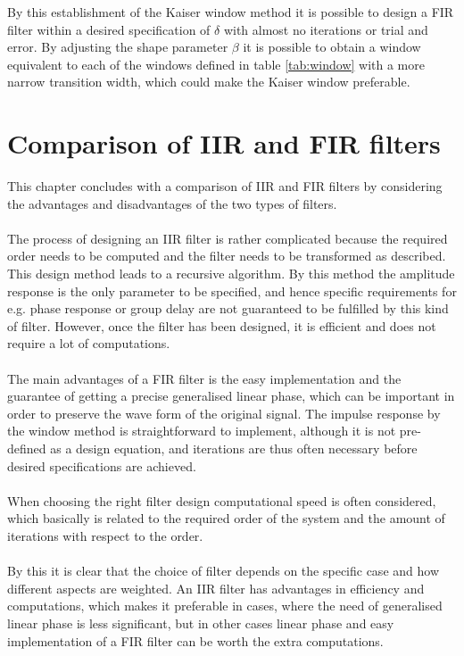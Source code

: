 By this establishment of the Kaiser window method it is possible to design a FIR filter within a desired specification of $\delta$ with almost no iterations or trial and error. By adjusting the shape parameter $\beta$ it is possible to obtain a window equivalent to each of the windows defined in table \ref{tab:window} with a more narrow transition width, which could make the Kaiser window preferable.

\section{Comparison of IIR and FIR filters}
This chapter concludes with a comparison of IIR and FIR filters by considering the advantages and disadvantages of the two types of filters.
\\ \\
The process of designing an IIR filter is rather complicated because the required order needs to be computed and the filter needs to be transformed as described. This design method leads to a recursive algorithm. By this method the amplitude response is the only parameter to be specified, and hence specific requirements for e.g. phase response or group delay are not guaranteed to be fulfilled by this kind of filter. However, once the filter has been designed, it is efficient and does not require a lot of computations.
\\ \\
The main advantages of a FIR filter is the easy implementation and the guarantee of getting a precise generalised linear phase, which can be important in order to preserve the wave form of the original signal. The impulse response by the window method is straightforward to implement, although it is not pre-defined as a design equation, and iterations are thus often necessary before desired specifications are achieved.
\\ \\
When choosing the right filter design computational speed is often considered, which basically is related to the required order of the system and the amount of iterations with respect to the order.
\\ \\
By this it is clear that the choice of filter depends on the specific case and how different aspects are weighted. An IIR filter has advantages in efficiency and computations, which makes it preferable in cases, where the need of generalised linear phase is less significant, but in other cases linear phase and easy implementation of a FIR filter can be worth the extra computations.